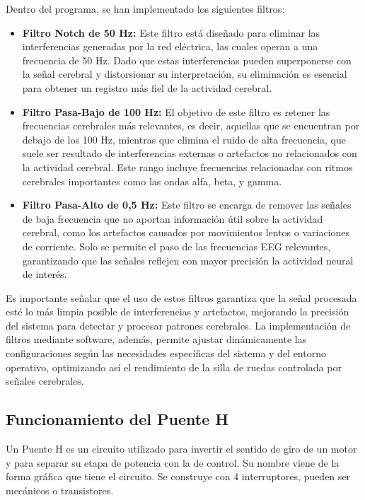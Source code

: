 \documentclass{article}
\begin{document}
Dentro del programa, se han implementado los siguientes filtros:

\begin{itemize}

    \item \textbf{Filtro Notch de 50 Hz:} Este filtro está diseñado para eliminar las interferencias generadas por la red eléctrica, las cuales operan a una frecuencia de 50 Hz. Dado que estas interferencias pueden superponerse con la señal cerebral y distorsionar su interpretación, su eliminación es esencial para obtener un registro más fiel de la actividad cerebral.
    
    \item \textbf{Filtro Pasa-Bajo de 100 Hz:} El objetivo de este filtro es retener las frecuencias cerebrales más relevantes, es decir, aquellas que se encuentran por debajo de los 100 Hz, mientras que elimina el ruido de alta frecuencia, que suele ser resultado de interferencias externas o artefactos no relacionados con la actividad cerebral. Este rango incluye frecuencias relacionadas con ritmos cerebrales importantes como las ondas alfa, beta, y gamma.
    
    \item \textbf{Filtro Pasa-Alto de 0,5 Hz:} Este filtro se encarga de remover las señales de baja frecuencia que no aportan información útil sobre la actividad cerebral, como los artefactos causados por movimientos lentos o variaciones de corriente. Solo se permite el paso de las frecuencias EEG relevantes, garantizando que las señales reflejen con mayor precisión la actividad neural de interés.
    
\end{itemize}

Es importante señalar que el uso de estos filtros garantiza que la señal procesada esté lo más limpia posible de interferencias y artefactos, mejorando la precisión del sistema para detectar y procesar patrones cerebrales. La implementación de filtros mediante software, además, permite ajustar dinámicamente las configuraciones según las necesidades específicas del sistema y del entorno operativo, optimizando así el rendimiento de la silla de ruedas controlada por señales cerebrales.

\subsection{Funcionamiento del Puente H}

Un Puente H es un circuito utilizado para invertir el sentido de giro de un motor y para separar su etapa de potencia con la de control. Su nombre viene de la forma gráfica que tiene el circuito. Se construye con 4 interruptores, pueden ser mecánicos o transistores.
\end{document}
